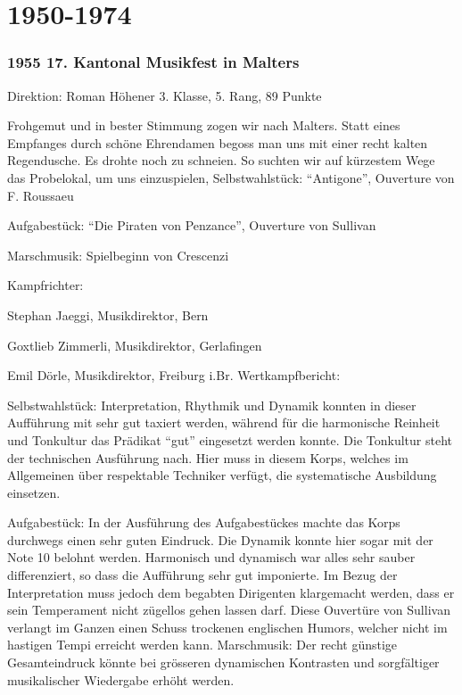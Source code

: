 \section*{1950-1974}

\begin{history}

    \subsubsection*{1955 17. Kantonal Musikfest in Malters}

    Direktion: Roman Höhener 3. Klasse, 5. Rang, 89 Punkte

    Frohgemut und in bester Stimmung zogen wir nach Malters. Statt eines
    Empfanges durch schöne Ehrendamen begoss man uns mit einer recht kalten
    Regendusche. Es drohte noch zu schneien. So suchten wir auf kürzestem Wege
    das Probelokal, um uns einzuspielen, Selbstwahlstück: \enquote{Antigone},
    Ouverture von F. Roussaeu

    Aufgabestück: \enquote{Die Piraten von Penzance}, Ouverture von Sullivan

    Marschmusik: Spielbeginn von Crescenzi

    Kampfrichter:

    Stephan Jaeggi, Musikdirektor, Bern

    Goxtlieb Zimmerli, Musikdirektor, Gerlafingen

    Emil Dörle, Musikdirektor, Freiburg i.Br. Wertkampfbericht:

    Selbstwahlstück: Interpretation, Rhythmik und Dynamik konnten in dieser
    Aufführung mit sehr gut taxiert werden, während für die harmonische Reinheit
    und Tonkultur das Prädikat \enquote{gut} eingesetzt werden konnte. Die
    Tonkultur steht der technischen Ausführung nach. Hier muss in diesem Korps,
    welches im Allgemeinen über respektable Techniker verfügt, die systematische
    Ausbildung einsetzen.

    Aufgabestück: In der Ausführung des Aufgabestückes machte das Korps
    durchwegs einen sehr guten Eindruck. Die Dynamik konnte hier sogar mit der
    Note 10 belohnt werden. Harmonisch und dynamisch war alles sehr sauber
    differenziert, so dass die Aufführung sehr gut imponierte. Im Bezug der
    Interpretation muss jedoch dem begabten Dirigenten klargemacht werden, dass
    er sein Temperament nicht zügellos gehen lassen darf. Diese Ouvertüre von
    Sullivan verlangt im Ganzen einen Schuss trockenen englischen Humors,
    welcher nicht im hastigen Tempi erreicht werden kann. Marschmusik: Der recht
    günstige Gesamteindruck könnte bei grösseren dynamischen Kontrasten und
    sorgfältiger musikalischer Wiedergabe erhöht werden.



\end{history}
